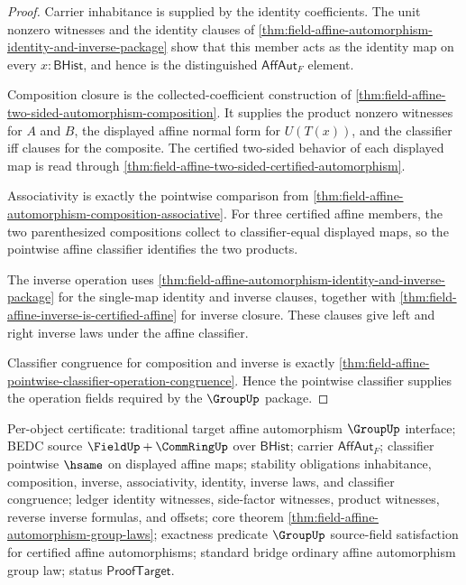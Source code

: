 \begin{proof}
Carrier inhabitance is supplied by the identity coefficients. The unit nonzero
witnesses and the identity clauses of
\autoref{thm:field-affine-automorphism-identity-and-inverse-package} show that
this member acts as the identity map on every $x:\mathsf{BHist}$, and hence is
the distinguished $\mathsf{AffAut}_F$ element.

Composition closure is the collected-coefficient construction of
\autoref{thm:field-affine-two-sided-automorphism-composition}. It supplies the
product nonzero witnesses for $A$ and $B$, the displayed affine normal form for
$U(T(x))$, and the classifier iff clauses for the composite. The certified
two-sided behavior of each displayed map is read through
\autoref{thm:field-affine-two-sided-certified-automorphism}.

Associativity is exactly the pointwise comparison from
\autoref{thm:field-affine-automorphism-composition-associative}. For three
certified affine members, the two parenthesized compositions collect to
classifier-equal displayed maps, so the pointwise affine classifier identifies
the two products.

The inverse operation uses
\autoref{thm:field-affine-automorphism-identity-and-inverse-package} for the
single-map identity and inverse clauses, together with
\autoref{thm:field-affine-inverse-is-certified-affine} for inverse closure.
These clauses give left and right inverse laws under the affine classifier.

Classifier congruence for composition and inverse is exactly
\autoref{thm:field-affine-pointwise-classifier-operation-congruence}. Hence the
pointwise classifier supplies the operation fields required by the
$\GroupUp$ package.
\end{proof}

Per-object certificate: traditional target affine automorphism $\GroupUp$
interface; BEDC source $\FieldUp+\CommRingUp$ over $\mathsf{BHist}$; carrier
$\mathsf{AffAut}_F$; classifier pointwise $\hsame$ on displayed affine maps;
stability obligations inhabitance, composition, inverse, associativity,
identity, inverse laws, and classifier congruence; ledger identity witnesses,
side-factor witnesses, product witnesses, reverse inverse formulas, and
offsets; core theorem
\autoref{thm:field-affine-automorphism-group-laws}; exactness predicate
$\GroupUp$ source-field satisfaction for certified affine automorphisms;
standard bridge ordinary affine automorphism group law; status
$\mathsf{ProofTarget}$.

